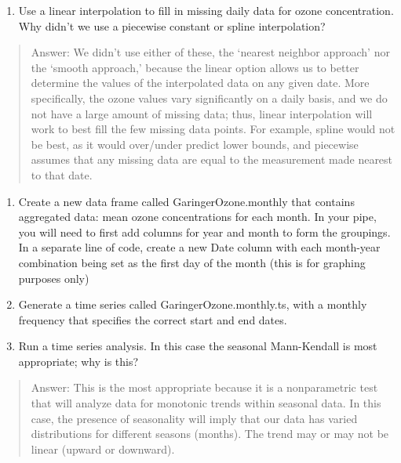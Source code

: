 \documentclass[]{article}
\providecommand{\tightlist}{%
  \setlength{\itemsep}{0pt}\setlength{\parskip}{0pt}}
\begin{document}
\begin{enumerate}
\def\labelenumi{\arabic{enumi}.}
\setcounter{enumi}{7}
\tightlist
\item
  Use a linear interpolation to fill in missing daily data for ozone
  concentration. Why didn't we use a piecewise constant or spline
  interpolation?
\end{enumerate}

\begin{quote}
Answer: We didn't use either of these, the `nearest neighbor approach'
nor the `smooth approach,' because the linear option allows us to better
determine the values of the interpolated data on any given date. More
specifically, the ozone values vary significantly on a daily basis, and
we do not have a large amount of missing data; thus, linear
interpolation will work to best fill the few missing data points. For
example, spline would not be best, as it would over/under predict lower
bounds, and piecewise assumes that any missing data are equal to the
measurement made nearest to that date.
\end{quote}

\begin{enumerate}
\def\labelenumi{\arabic{enumi}.}
\setcounter{enumi}{8}
\item
  Create a new data frame called GaringerOzone.monthly that contains
  aggregated data: mean ozone concentrations for each month. In your
  pipe, you will need to first add columns for year and month to form
  the groupings. In a separate line of code, create a new Date column
  with each month-year combination being set as the first day of the
  month (this is for graphing purposes only)
\item
  Generate a time series called GaringerOzone.monthly.ts, with a monthly
  frequency that specifies the correct start and end dates.
\item
  Run a time series analysis. In this case the seasonal Mann-Kendall is
  most appropriate; why is this?
\end{enumerate}

\begin{quote}
Answer: This is the most appropriate because it is a nonparametric test
that will analyze data for monotonic trends within seasonal data. In
this case, the presence of seasonality will imply that our data has
varied distributions for different seasons (months). The trend may or
may not be linear (upward or downward).
\end{quote}
\end{document}
